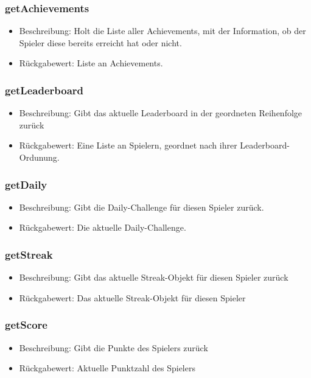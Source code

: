 \documentclass[a4paper]{scrreprt}
\begin{document}
	\subsubsection{getAchievements}
	\begin{itemize}
		\item Beschreibung: Holt die Liste aller Achievements, mit der Information, ob der Spieler diese bereits erreicht hat oder nicht.
		\item Rückgabewert: Liste an Achievements.
	\end{itemize}
	\subsubsection{getLeaderboard}
	\begin{itemize}
		\item Beschreibung: Gibt das aktuelle Leaderboard in der geordneten Reihenfolge zurück
		\item Rückgabewert: Eine Liste an Spielern, geordnet nach ihrer Leaderboard-Ordunung.
	\end{itemize}
	\subsubsection{getDaily}
	\begin{itemize}
		\item Beschreibung: Gibt die Daily-Challenge für diesen Spieler zurück.
		\item Rückgabewert: Die aktuelle Daily-Challenge.
	\end{itemize}
	\subsubsection{getStreak}
	\begin{itemize}
		\item Beschreibung: Gibt das aktuelle Streak-Objekt für diesen Spieler zurück
		\item Rückgabewert: Das aktuelle Streak-Objekt für diesen Spieler
	\end{itemize}
	\subsubsection{getScore}
	\begin{itemize}
		\item Beschreibung: Gibt die Punkte des Spielers zurück
		\item Rückgabewert: Aktuelle Punktzahl des Spielers
	\end{itemize}
\end{document}
